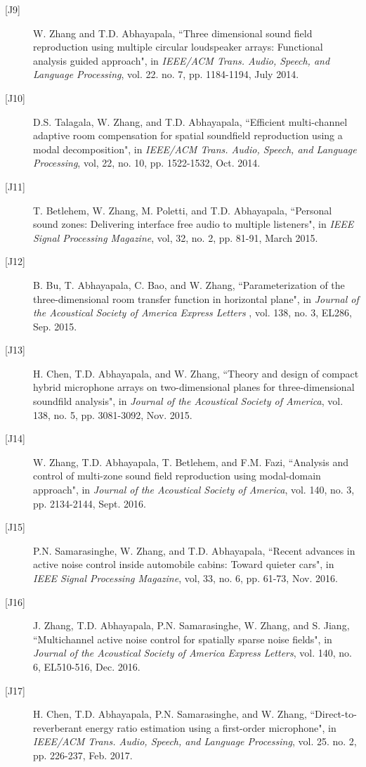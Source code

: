\documentclass[10pt]{article}
\begin{document}
\begin{description}
\item[{[}J9{]}]W. Zhang and T.D. Abhayapala, ``Three dimensional sound field reproduction using multiple circular loudspeaker arrays: Functional analysis guided approach", in {\em IEEE/ACM Trans. Audio, Speech, and Language Processing}, vol. 22. no. 7, pp. 1184-1194, July 2014.

\item[{[}J10{]}]D.S. Talagala, W. Zhang, and T.D. Abhayapala, ``Efficient multi-channel adaptive room compensation for spatial soundfield reproduction using a modal decomposition", in {\em IEEE/ACM Trans. Audio, Speech, and Language Processing},  vol, 22, no. 10, pp. 1522-1532, Oct. 2014.

\item[{[}J11{]}]T. Betlehem, W. Zhang, M. Poletti, and T.D. Abhayapala, ``Personal sound zones: Delivering interface free audio to multiple listeners", in {\em IEEE Signal Processing Magazine}, vol, 32, no. 2, pp. 81-91, March 2015.

\item[{[}J12{]}]B. Bu, T. Abhayapala, C. Bao, and W. Zhang, ``Parameterization of the three-dimensional room transfer function in horizontal plane", in {\em Journal of the Acoustical Society of America Express Letters} , vol. 138, no. 3, EL286, Sep. 2015.

\item[{[}J13{]}]H. Chen, T.D. Abhayapala, and W. Zhang, ``Theory and design of compact hybrid microphone arrays on two-dimensional planes for three-dimensional soundfild analysis", in {\em Journal of the Acoustical Society of America}, vol. 138, no. 5, pp. 3081-3092, Nov. 2015.

\item[{[}J14{]}]W. Zhang, T.D. Abhayapala, T. Betlehem, and F.M. Fazi, ``Analysis and control of multi-zone sound field reproduction using modal-domain approach", in {\em Journal of the Acoustical Society of America}, vol. 140, no. 3, pp. 2134-2144, Sept. 2016.

\item[{[}J15{]}]P.N. Samarasinghe, W. Zhang, and T.D. Abhayapala, ``Recent advances in active noise control inside automobile cabins: Toward quieter cars", in {\em IEEE Signal Processing Magazine}, vol, 33, no. 6, pp. 61-73, Nov. 2016.

\item[{[}J16{]}]J. Zhang, T.D. Abhayapala, P.N. Samarasinghe, W. Zhang, and S. Jiang, ``Multichannel active noise control for spatially sparse noise fields", in {\em Journal of the Acoustical Society of America Express Letters}, vol. 140, no. 6, EL510-516, Dec. 2016.

\item[{[}J17{]}] H. Chen, T.D. Abhayapala, P.N. Samarasinghe, and W. Zhang, ``Direct-to-reverberant energy ratio estimation using a first-order microphone", in {\em IEEE/ACM Trans. Audio, Speech, and Language Processing}, vol. 25. no. 2, pp. 226-237, Feb. 2017.

\end{description}
\end{document}
